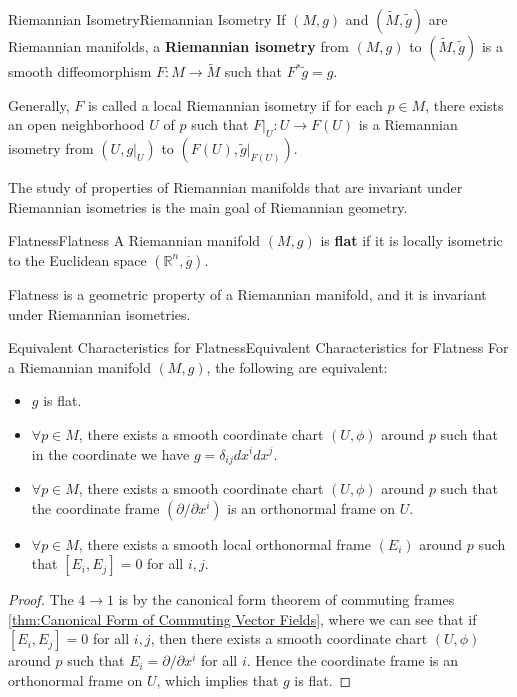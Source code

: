 \documentclass[../main.tex]{subfiles}
\begin{document}
\begin{definition}{Riemannian Isometry}{Riemannian Isometry}
  If $(M,g)$ and $(\tilde{M}, \tilde{g})$ are Riemannian manifolds, a \textbf{Riemannian isometry} from $(M,g)$ to $(\tilde{M}, \tilde{g})$ is a smooth diffeomorphism $F:M\to \tilde{M}$ such that $F^*\tilde{g} = g$.

  Generally, $F$ is called a local Riemannian isometry if for each $p\in M$, there exists an open neighborhood $U$ of $p$ such that $F|_U:U\to F(U)$ is a Riemannian isometry from $(U, g|_U)$ to $(F(U), \tilde{g}|_{F(U)})$.

  The study of properties of Riemannian manifolds that are invariant under Riemannian isometries is the main goal of Riemannian geometry.
\end{definition}

\begin{definition}{Flatness}{Flatness}
  A Riemannian manifold $(M,g)$ is \textbf{flat} if it is locally isometric to the Euclidean space $(\mathbb{R}^n, \overline{g})$.
\end{definition}
Flatness is a geometric property of a Riemannian manifold, and it is invariant under Riemannian isometries.

\begin{theorem}{Equivalent Characteristics for Flatness}{Equivalent Characteristics for Flatness}
  For a Riemannian manifold $(M,g)$, the following are equivalent:
  \begin{itemize}
    \item $g$ is flat.
    \item $\forall p\in M$, there exists a smooth coordinate chart $(U, \phi)$ around $p$ such that in the coordinate we have $g = \delta_{ij}dx^i dx^j$.
    \item $\forall p\in M$, there exists a smooth coordinate chart $(U, \phi)$ around $p$ such that the coordinate frame $(\partial/\partial x^i)$ is an orthonormal frame on $U$.
    \item $\forall p\in M$, there exists a smooth local orthonormal frame $(E_i)$ around $p$ such that $[E_i, E_j] = 0$ for all $i,j$.
  \end{itemize}
\end{theorem}
\begin{proof}
  The $4 \rightarrow 1$ is by the canonical form theorem of commuting frames \ref{thm:Canonical Form of Commuting Vector Fields}, where we can see that if $[E_i, E_j] = 0$ for all $i,j$, then there exists a smooth coordinate chart $(U, \phi)$ around $p$ such that $E_i = \partial/\partial x^i$ for all $i$. Hence the coordinate frame is an orthonormal frame on $U$, which implies that $g$ is flat.
\end{proof}
\end{document}
